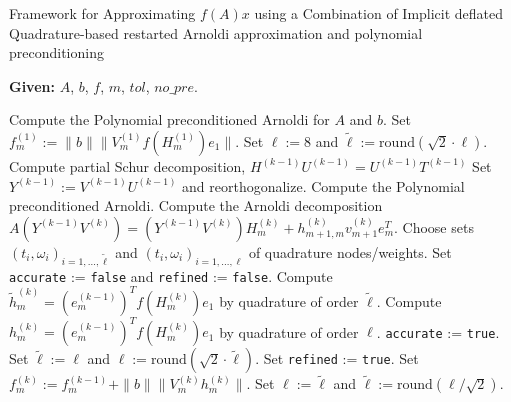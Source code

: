 \begin{algorithm}[H]
    \caption{Framework for Approximating $f(A)x$ using a Combination of Implicit deflated Quadrature-based restarted Arnoldi approximation and polynomial preconditioning}
    \label{alg:combo_impl_quad_rest_arnoldi_and_poly_precond}
    \textbf{Given:} $A$, $b$, $f$, $m$, $tol$, $no\_pre$.
    \begin{algorithmic}[1]
        \STATE Compute the Polynomial preconditioned Arnoldi for $A$ and $b$.
        \STATE Set $f_m^{(1)} := \|b\|\|V^{(1)}_m f(H_m^{(1)}) e_1\|$.
        \STATE Set $\ell := 8$ and $\tilde{\ell} := \text{round}(\sqrt{2} \cdot \ell)$.
            \STATE Compute partial Schur decomposition, $H^{(k-1)} U^{(k-1)} = U^{(k-1)} T^{(k-1)}$
            \STATE Set $Y^{(k-1)} := V^{(k-1)} U^{(k-1)}$ and reorthogonalize.
                \STATE Compute the Polynomial preconditioned Arnoldi.
            \ELSE
                \STATE Compute the Arnoldi decomposition $A(Y^{(k-1)} V^{(k)}) =(Y^{(k-1)} V^{(k)}) H^{(k)}_m + h^{(k)}_{m+1,m}v^{(k)}_{m+1}e_m^T$.
            \ENDIF
            \STATE Choose sets $(t_i, \omega_i)_{i=1,\dots,\tilde{\ell}}$ and $(t_i, \omega_i)_{i=1,\dots,\ell}$ of quadrature nodes/weights.
            \STATE Set \texttt{accurate} := \texttt{false} and \texttt{refined} := \texttt{false}.
                \STATE Compute $\tilde{h}_m^{(k)} = (e_m^{(k-1)})^T f(H_m^{(k)}) e_1$ by quadrature of order $\tilde{\ell}$.
                \STATE Compute $h_m^{(k)} = (e_m^{(k-1)})^T f(H_m^{(k)}) e_1$ by quadrature of order $\ell$.
                    \STATE \texttt{accurate} := \texttt{true}.
                \ELSE
                    \STATE Set $\tilde{\ell} := \ell$ and $\ell := \text{round}(\sqrt{2} \cdot \tilde{\ell})$.
                    \STATE Set \texttt{refined} := \texttt{true}.
                \ENDIF
            \ENDWHILE
            \STATE Set $f_m^{(k)} := f_m^{(k-1)} + \|b\|\|V_m^{(k)} h_m^{(k)}\|$.
                \STATE Set $\ell := \tilde{\ell}$ and $\tilde{\ell} := \text{round}(\ell / \sqrt{2})$.
            \ENDIF
        \ENDFOR
    \end{algorithmic}
\end{algorithm}